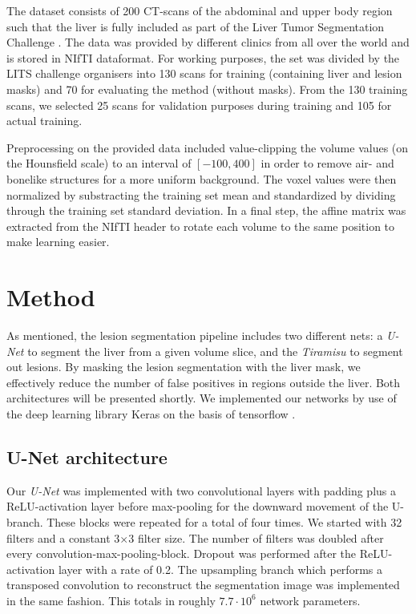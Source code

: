 \documentclass{article}
\begin{document}
The dataset consists of 200 CT-scans
of the abdominal and upper body region such that the liver is fully included as part of the Liver Tumor Segmentation Challenge \cite{litsnew}.
The data was provided by different clinics from all over the world
and is stored in NIfTI dataformat.
For working purposes, the set was divided by the LITS challenge organisers
into 130 scans for training (containing liver and lesion masks)
and 70 for evaluating the method (without masks).
From the 130 training scans, we selected 25 scans for validation purposes during
training and 105 for actual training.


Preprocessing on the provided data included value-clipping the volume values (on the Hounsfield scale) to an interval of $[-100,400]$ in order to remove air- and bonelike structures for a more uniform background. The voxel values were then normalized by substracting the training set mean and standardized by dividing through the training set standard deviation. In a final step, the affine matrix was extracted from the NIfTI header to rotate each volume to the same position to make learning easier.



\section{Method}
\label{sec:method}

As mentioned, the lesion segmentation pipeline includes two different nets:
a \textit{U-Net} to segment the liver from a given volume slice,
and the \textit{Tiramisu} to segment out lesions.
By masking the lesion segmentation with the liver mask, we effectively reduce the number of false positives in regions outside the liver.
Both architectures will be presented shortly.
We implemented our networks by use of the deep learning library Keras \cite{KERAS} on the basis of tensorflow \cite{tensorflow}.


\subsection{U-Net architecture}
Our \textit{U-Net} was implemented with two convolutional layers with padding plus a ReLU-activation layer
before max-pooling for the downward movement of the U-branch.
These blocks were repeated for a total of four times.
We started with 32 filters and a constant 3$\times$3 filter size.
The number of filters was doubled after every convolution-max-pooling-block.
Dropout was performed after the ReLU-activation layer with a rate of 0.2.
The upsampling branch which performs a transposed convolution to reconstruct
the segmentation image was implemented in the same fashion. This totals in roughly $7.7\cdot 10^6$ network parameters.
\end{document}
